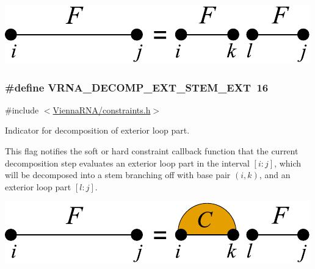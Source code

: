  
\begin{DoxyImageNoCaption}
  \mbox{\includegraphics[width=\textwidth,height=\textheight/2,keepaspectratio=true]{decomp_ext_ext_ext}}
\end{DoxyImageNoCaption}
\subsubsection[{\texorpdfstring{V\+R\+N\+A\+\_\+\+D\+E\+C\+O\+M\+P\+\_\+\+E\+X\+T\+\_\+\+S\+T\+E\+M\+\_\+\+E\+XT}{VRNA_DECOMP_EXT_STEM_EXT}}]{\setlength{\rightskip}{0pt plus 5cm}\#define V\+R\+N\+A\+\_\+\+D\+E\+C\+O\+M\+P\+\_\+\+E\+X\+T\+\_\+\+S\+T\+E\+M\+\_\+\+E\+XT~16}\hypertarget{group__constraints_gabb09c5b78b75a44502fc77b950125c1e}{}\label{group__constraints_gabb09c5b78b75a44502fc77b950125c1e}


{\ttfamily \#include $<$\hyperlink{constraints_8h}{Vienna\+R\+N\+A/constraints.\+h}$>$}



Indicator for decomposition of exterior loop part. 

This flag notifies the soft or hard constraint callback function that the current decomposition step evaluates an exterior loop part in the interval $[i:j]$, which will be decomposed into a stem branching off with base pair $(i,k)$, and an exterior loop part $[l:j]$.

 
\begin{DoxyImageNoCaption}
  \mbox{\includegraphics[width=\textwidth,height=\textheight/2,keepaspectratio=true]{decomp_ext_stem_ext}}
\end{DoxyImageNoCaption}

